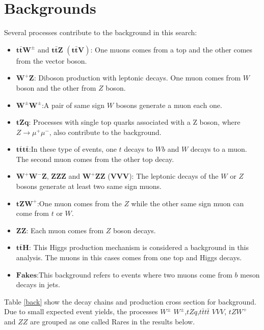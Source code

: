 \section{Backgrounds}
Several processes contribute to the background in this search:
\begin{itemize}
		\item $\bm{t\bar{t}W^{\pm}}$ and $\bm{t\bar{t}Z}$ $\bm{(t\bar{t}V)}$: One muons comes from a top and the other comes from the vector boson.
			\item $\bm{W^{+}Z}$: Diboson production with leptonic decays. One muon comes from $W$ boson and the other from $Z$ boson.
		\item $\bm{W^{\pm}W^{\pm}}$:A pair of same sign $W$ bosons generate a muon each one.
		\item $\bm{tZq}$: Processes with single top quarks associated with a Z boson, where $Z\rightarrow \mu^+ \mu^-$, also contribute to the background.
	\item $\bm{t\bar{t}t\bar{t}}$:In these type of events, one $t$ decays to $Wb$ and $W$ decays to a muon. The second muon comes from the other top decay.
		\item$\bm{W^{+}W^{-}Z}$, $\bm{ZZZ}$ and $\bm{W^{+}ZZ}$ ($\bm{VVV}$): The leptonic decays of the $W$ or $Z$ bosons generate at least two same sign muons.
	\item $\bm{tZW^{+}}$:One muon comes from the $Z$ while the other same sign muon can come from $t$ or $W$. 
	\item $\bm{ZZ}$: Each muon comes from $Z$ boson decays.
			\item $\bm{t\bar{t}H}$: This Higgs production mechanism is considered a background in this analysis. The muons in this cases comes from one top and Higgs decays. 
	\item $\bm{Fakes}$:This background refers to events where two muons come from $b$ meson decays in jets.
\end{itemize}
Table \ref{back} show the decay chains and production cross section for background. Due to small expected event yields, the processes $W^\pm$ $W^\pm$,$tZq$,$t\bar{t}t\bar{t}$ $VVV$, $tZW^+$ and $ZZ$ are grouped as one called Rares in the results below.


